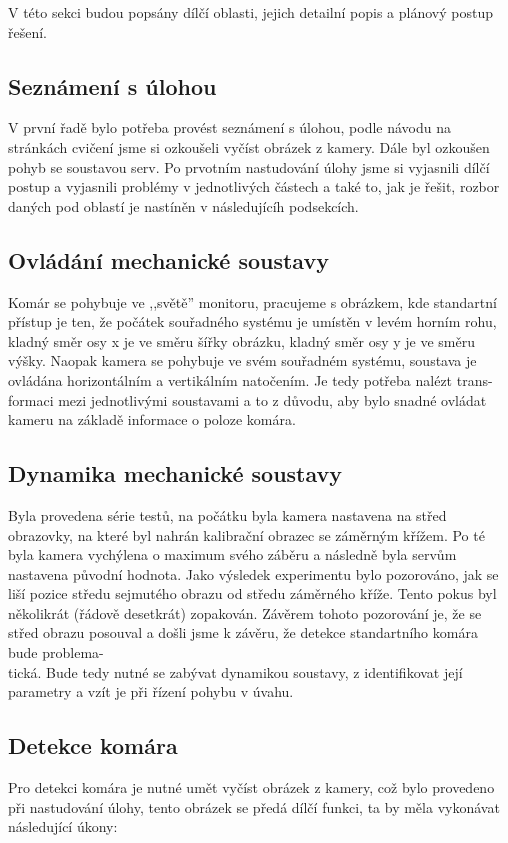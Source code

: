 \documentclass[a4paper,10pt]{article}
\begin{document}
V této sekci budou popsány dílčí oblasti, jejich detailní popis a plánový postup řešení. 

\subsection{Seznámení s úlohou}

V první řadě bylo potřeba provést seznámení s úlohou, podle návodu na stránkách cvičení \cite{web} jsme si ozkoušeli vyčíst obrázek z kamery. Dále byl ozkoušen pohyb se soustavou serv. Po prvotním nastudování úlohy jsme si vyjasnili dílčí postup a vyjasnili problémy v jednotlivých částech a také to, jak je řešit, rozbor daných pod oblastí je nastíněn v následujícíh podsekcích.

\subsection{Ovládání mechanické soustavy}
Komár se pohybuje ve ,,světě'' monitoru, pracujeme s obrázkem, kde standartní přístup je ten, že počátek souřadného systému je umístěn v levém horním rohu, kladný směr osy x je ve směru šířky obrázku, kladný směr osy y je ve směru výšky. Naopak kamera se pohybuje ve svém souřadném systému, soustava je ovládána horizontálním a vertikálním natočením. Je tedy potřeba nalézt trans-\\formaci mezi jednotlivými soustavami a to z důvodu, aby bylo snadné ovládat kameru na základě informace o poloze komára.

\subsection{Dynamika mechanické soustavy}
Byla provedena série testů, na počátku byla kamera nastavena na střed obrazovky, na které byl nahrán kalibrační obrazec se záměrným křížem. Po té byla kamera vychýlena o maximum svého záběru a následně byla servům nastavena původní hodnota. Jako výsledek experimentu bylo pozorováno, jak se liší pozice středu sejmutého obrazu od středu záměrného kříže. Tento pokus byl několikrát (řádově desetkrát) zopakován. Závěrem tohoto pozorování je, že se střed obrazu posouval a došli jsme k závěru, že detekce standartního komára bude problema-\\tická. Bude tedy nutné se zabývat dynamikou soustavy, z identifikovat její parametry a vzít je při řízení pohybu v úvahu.

\subsection{Detekce komára}
Pro detekci komára je nutné umět vyčíst obrázek z kamery, což bylo provedeno při nastudování úlohy, tento obrázek se předá dílčí funkci, ta by měla vykonávat následující úkony:
\end{document}
